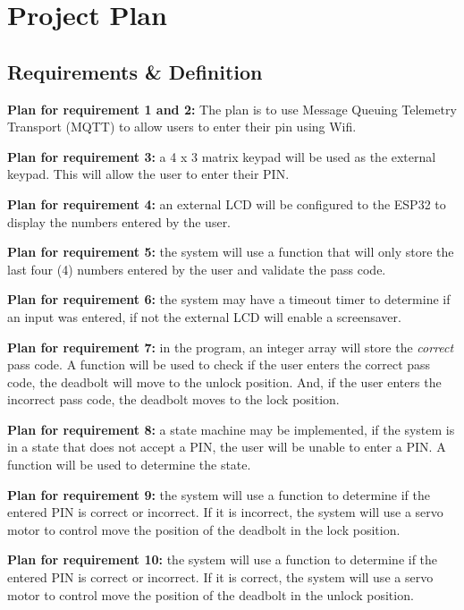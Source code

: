 \chapter{Project Plan}

\section{Requirements \& Definition}
\textbf{Plan for requirement 1 and 2:} The plan is to use Message Queuing Telemetry
Transport (MQTT) to allow users to enter their pin using Wifi. \newline 

\textbf{Plan for requirement 3:} a 4 x 3 matrix keypad will be used as the external keypad. This will allow the user to enter their PIN. 

\textbf{Plan for requirement 4:} an external LCD will be configured to the ESP32 to display the numbers entered by the user. 

\textbf{Plan for requirement 5:} the system will use a function that will only store the last four (4) numbers entered by the user and validate the pass code. 

\textbf{Plan for requirement 6:} the system may have a timeout timer to determine if an input was entered, if not the external LCD will enable a screensaver. 


\textbf{Plan for requirement 7:} in the program, an integer array will store the \textit{correct} pass code. A function will be used to check if the user enters the correct pass code, the deadbolt will move to the unlock position. And, if the user enters the incorrect pass code, the deadbolt moves to the lock position. 

\textbf{Plan for requirement 8:} a state machine may be implemented, if the system is in a state that does not accept a PIN, the user will be unable to enter a PIN. A function will be used to determine the state. 

\textbf{Plan for requirement 9:} the system will use a function to determine if the entered PIN is correct or incorrect. If it is incorrect, the system will use a servo motor to control move the position of the deadbolt in the lock position. 

\textbf{Plan for requirement 10:} the system will use a function to determine if the entered PIN is correct or incorrect. If it is correct, the system will use a servo motor to control move the position of the deadbolt in the unlock position. 

